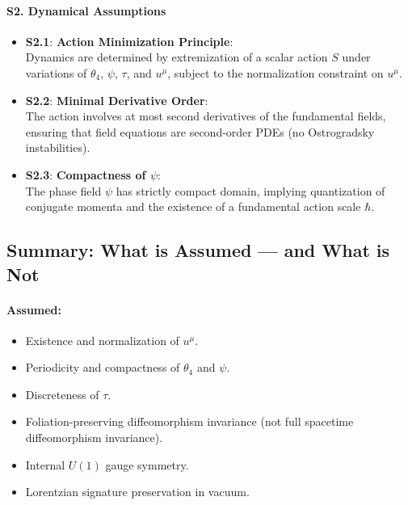 \documentclass[12pt]{article}
\begin{document}
\paragraph{S2. Dynamical Assumptions}
\begin{itemize}
    \item \textbf{S2.1}: \textbf{Action Minimization Principle}: \\
    Dynamics are determined by extremization of a scalar action \( S \) under variations of \( \theta_4 \), \( \psi \), \( \tau \), and \( u^\mu \), subject to the normalization constraint on \( u^\mu \).

    \item \textbf{S2.2}: \textbf{Minimal Derivative Order}: \\
    The action involves at most second derivatives of the fundamental fields, ensuring that field equations are second-order PDEs (no Ostrogradsky instabilities).

    \item \textbf{S2.3}: \textbf{Compactness of \( \psi \)}: \\
    The phase field \( \psi \) has strictly compact domain, implying quantization of conjugate momenta and the existence of a fundamental action scale \( \hbar \).
\end{itemize}

\subsection*{Summary: What is Assumed — and What is Not}

\paragraph{Assumed:}
\begin{itemize}
    \item Existence and normalization of \( u^\mu \).
    \item Periodicity and compactness of \( \theta_4 \) and \( \psi \).
    \item Discreteness of \( \tau \).
    \item Foliation-preserving diffeomorphism invariance (not full spacetime diffeomorphism invariance).
    \item Internal \( U(1) \) gauge symmetry.
    \item Lorentzian signature preservation in vacuum.
\end{itemize}
\end{document}

